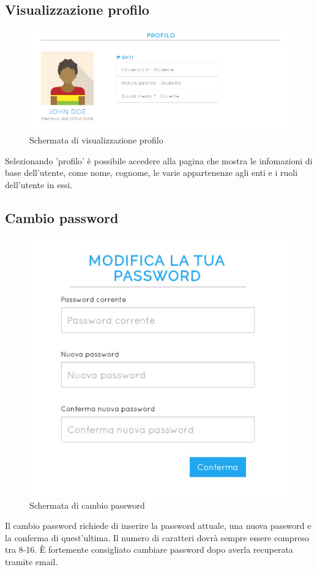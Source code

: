 \documentclass[a4paper, titlepage]{article}
\begin{document}
	 \subsection{Visualizzazione profilo}
	 \begin{figure}[!h]
	 	\centering
	 	\includegraphics[scale=0.33]{Img/screen_ProfiloUtente.png}
	 	\caption{Schermata di visualizzazione profilo}
	 \end{figure}
	 Selezionando 'profilo' è possibile accedere alla pagina che mostra le infomazioni di base dell'utente, come nome, cognome, le varie appartenenze agli enti e i ruoli dell'utente in essi.
	
	\subsection{Cambio password}
	
	\begin{figure}[!h]
		\centering
		\includegraphics[scale=0.33]{Img/screen_CambioPassword.png}
		\caption{Schermata di cambio password}
	\end{figure}
	Il cambio password richiede di inserire la password attuale, una nuova password e la conferma di quest'ultima. Il numero di caratteri dovrà sempre essere compreso tra 8-16. È fortemente consigliato cambiare password dopo averla recuperata tramite email.
	
\end{document}
